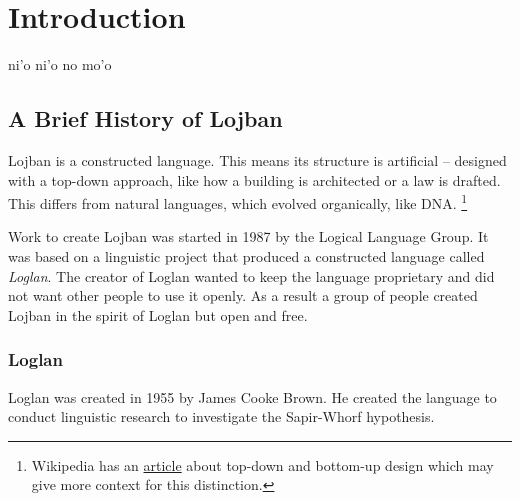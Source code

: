 \documentclass[12pt]{book}
\begin{document}

\tableofcontents

\chapter{Introduction}

ni'o ni'o no mo'o

\section{A Brief History of Lojban}

Lojban is a constructed language. This means its structure is artificial -- designed with a top-down approach, like how a building is architected or a law is drafted. This differs from natural languages, which evolved organically, like DNA. \footnote{Wikipedia has an \href{https://en.wikipedia.org/wiki/Top-down_and_bottom-up_design}{article} about top-down and bottom-up design which may give more context for this distinction.}



Work to create Lojban was started in 1987 by the Logical Language Group. It was based on a linguistic project that produced a constructed language called \emph{Loglan}. The creator of Loglan wanted to keep the language proprietary and did not want other people to use it openly. As a result a group of people created Lojban in the spirit of Loglan but open and free.  

\subsection{Loglan}

Loglan was created in 1955 by James Cooke Brown. He created the language to conduct linguistic research to investigate the Sapir-Whorf hypothesis.
\end{document}
